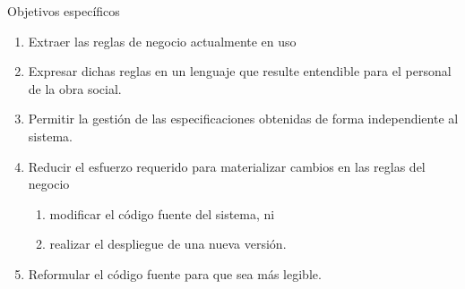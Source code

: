 \documentclass[10pt]{beamer}
\begin{document}
\begin{frame}{Objetivos específicos}
    \begin{enumerate}
        \item Extraer las reglas de negocio actualmente en uso
        \item Expresar dichas reglas en un lenguaje que resulte entendible para el personal de la obra social.
        \item Permitir la gestión de las especificaciones obtenidas de forma independiente al sistema.
        \item Reducir el esfuerzo requerido para materializar cambios en las reglas del negocio
        \begin{enumerate}
            \item modificar el código fuente del sistema, ni
            \item realizar el despliegue de una nueva versión.
        \end{enumerate}
        \item Reformular el código fuente para que sea más legible.
    \end{enumerate}
\end{frame}

\end{document}
